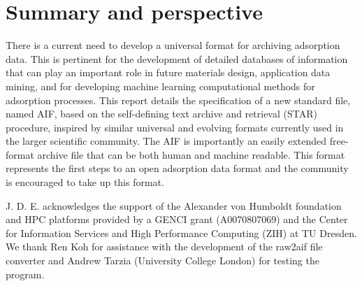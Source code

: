 \documentclass[journal=langd5,manuscript=article]{achemso}
\begin{document}
\section{Summary and perspective}
There is a current need to develop a universal format for archiving adsorption data.
This is pertinent for the development of detailed databases of information that can play an important role in future materials design, application data mining, and for developing machine learning computational methods for adsorption processes. \cite{10.1021/acs.chemmater.9b03376}
This report details the specification of a new standard file, named AIF, based on the self-defining text archive and retrieval (STAR) procedure, inspired by similar universal and evolving formats currently used in the larger scientific community.
The AIF is importantly an easily extended free-format archive file that can be both human and machine readable.
This format represents the first steps to an open adsorption data format and the community is encouraged to take up this format.



\begin{acknowledgement}
  J. D. E. acknowledges the support of the Alexander von Humboldt foundation and HPC platforms provided by a GENCI grant (A0070807069) and the Center for Information Services and High Performance Computing (ZIH) at TU Dresden.
  We thank Ren Koh for assistance with the development of the raw2aif file converter and Andrew Tarzia (University College London) for testing the program.
\end{acknowledgement}





\end{document}

